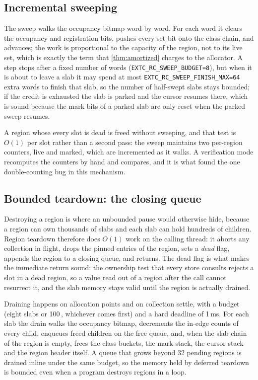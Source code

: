 \subsection{Incremental sweeping}
\label{sec:impl-sweep}

The sweep walks the occupancy bitmap word by word.  For each word it clears the occupancy and
registration bits, pushes every set bit onto the class chain, and advances; the work is
proportional to the capacity of the region, not to its live set, which is exactly the term that
\thm\ref{thm:amortized} charges to the allocator.  A step stops after a fixed number of words
(\texttt{EXTC\_RC\_SWEEP\_BUDGET=8}), but when it is about to leave a slab it may spend at most
\texttt{EXTC\_RC\_SWEEP\_FINISH\_MAX=64} extra words to finish that slab, so the number of
half-swept slabs stays bounded; if the credit is exhausted the slab is parked and the cursor
resumes there, which is sound because the mark bits of a parked slab are only reset when the
parked sweep resumes.

A region whose every slot is dead is freed without sweeping, and that test is $O(1)$ per
slot rather than a second pass: the sweep maintains two per-region counters, live and marked,
which are incremented as it walks.  A verification mode recomputes the counters by hand and
compares, and it is what found the one double-counting bug in this mechanism.

\subsection{Bounded teardown: the closing queue}
\label{sec:impl-close}

Destroying a region is where an unbounded pause would otherwise hide, because a region can own
thousands of slabs and each slab can hold hundreds of children.  Region teardown therefore does
$O(1)$ work on the calling thread: it aborts any collection in flight, drops the pinned entries
of the region, sets a \emph{dead} flag, appends the region to a closing queue, and returns.
The dead flag is what makes the immediate return sound: the ownership test that every store
consults rejects a slot in a dead region, so a value read out of a region after the call cannot
resurrect it, and the slab memory stays valid until the region is actually drained.

Draining happens on allocation points and on collection settle, with a budget (eight slabs or
100\,\us, whichever comes first) and a hard deadline of 1\,ms.  For each slab the drain walks the
occupancy bitmap, decrements the in-edge counts of every child, enqueues freed children on the
free queue, and, when the slab chain of the region is empty, frees the class buckets, the mark
stack, the cursor stack and the region header itself.  A queue that grows beyond 32 pending
regions is drained inline under the same budget, so the memory held by deferred teardown is
bounded even when a program destroys regions in a loop.

